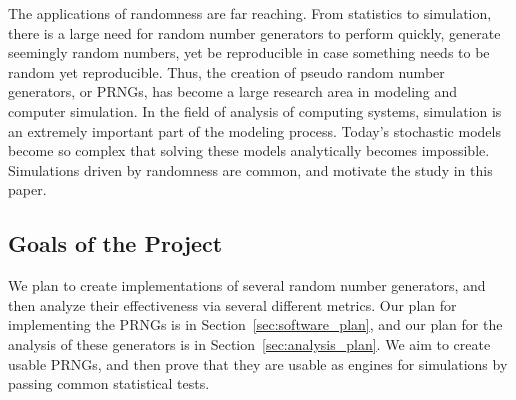 The applications of randomness are far reaching. From statistics to simulation, there is a large need for random number generators to perform quickly, generate seemingly random numbers, yet be reproducible in case something needs to be random yet reproducible. Thus, the creation of pseudo random number generators, or PRNGs, has become a large research area in modeling and computer simulation. In the field of analysis of computing systems, simulation is an extremely important part of the modeling process. Today's stochastic models become so complex that solving these models analytically becomes impossible. Simulations driven by randomness are common, and motivate the study in this paper.

\subsection{Goals of the Project}

We plan to create implementations of several random number generators, and then analyze their effectiveness via several different metrics. Our plan for implementing the PRNGs is in Section~\ref{sec:software_plan}, and our plan for the analysis of these generators is in Section~\ref{sec:analysis_plan}. We aim to create usable PRNGs, and then prove that they are usable as engines for simulations by passing common statistical tests.
